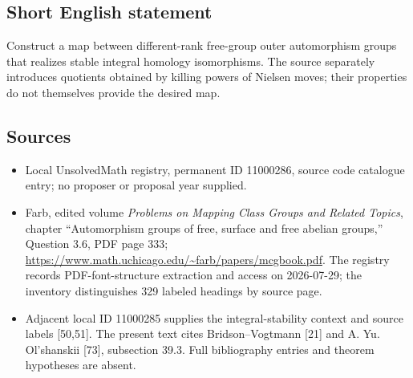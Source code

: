 \documentclass[11pt]{article}
\begin{document}
\subsection{Short English statement}
Construct a map between different-rank free-group outer automorphism groups that realizes stable integral homology isomorphisms. The source separately introduces quotients obtained by killing powers of Nielsen moves; their properties do not themselves provide the desired map.
\subsection{Sources}
\begin{itemize}
\item Local UnsolvedMath registry, permanent ID 11000286, source code catalogue entry; no proposer or proposal year supplied.
\item Farb, edited volume \emph{Problems on Mapping Class Groups and Related Topics}, chapter ``Automorphism groups of free, surface and free abelian groups,'' Question 3.6, PDF page 333; \url{https://www.math.uchicago.edu/~farb/papers/mcgbook.pdf}. The registry records PDF-font-structure extraction and access on 2026-07-29; the inventory distinguishes 329 labeled headings by source page.
\item Adjacent local ID 11000285 supplies the integral-stability context and source labels [50,51]. The present text cites Bridson--Vogtmann [21] and A. Yu. Ol'shanskii [73], subsection 39.3. Full bibliography entries and theorem hypotheses are absent.
\end{itemize}
\end{document}
